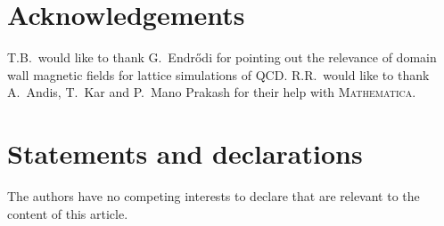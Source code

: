\documentclass[pdflatex,iicol,sn-mathphys-num]{sn-jnl}
\begin{document}

\backmatter
\section*{Acknowledgements}

T.B.~would like to thank G.~Endr\H{o}di for pointing out the relevance of domain wall magnetic fields for lattice simulations of QCD. R.R.~would like to thank A.~Andis, T.~Kar and P.~Mano Prakash for their help with \textsc{Mathematica}.


\section*{Statements and declarations}

The authors have no competing interests to declare that are relevant to the content of this article.

\end{document}
